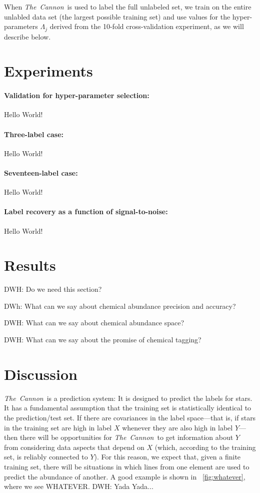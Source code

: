 \documentclass[12pt,preprint]{aastex}
\newcommand{\project}[1]{\textsl{#1}}
\newcommand{\TheCannon}{\project{The~Cannon}}
\begin{document}
When \TheCannon\ is used to label the full unlabeled set, we train on
the entire unlabled data set (the largest possible training set) and
use values for the hyper-parameters $\Lambda_j$ derived from the
10-fold cross-validation experiment, as we will describe below.


\section{Experiments}

\paragraph{Validation for hyper-parameter selection:}
Hello World!

\paragraph{Three-label case:}
Hello World!

\paragraph{Seventeen-label case:}
Hello World!

\paragraph{Label recovery as a function of signal-to-noise:}
Hello World!

\section{Results}

DWH: Do we need this section?

DWh: What can we say about chemical abundance precision and accuracy?

DWH: What can we say about chemical abundance space?

DWH: What can we say about the promise of chemical tagging?

\section{Discussion}


\TheCannon\ is a prediction system: It is designed to predict the
labels for stars.
It has a fundamental assumption that the training set is statistically
identical to the prediction/test set.
If there are covariances in the label space---that is, if stars in the
training set are high in label $X$ whenever they are also high in
label $Y$---then there will be opportunities for \TheCannon\ to get
information about $Y$ from considering data aspects that depend on
$X$ (which, according to the training set, is reliably connected to $Y$).
For this reason, we expect that, given a finite training set, there
will be situations in which lines from one element are used to predict
the abundance of another.
A good example is shown in \figurename~\ref{fig:whatever}, where we
see WHATEVER.
DWH: Yada Yada...
\end{document}
